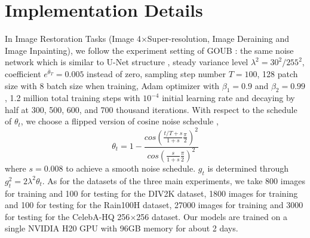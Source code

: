           
    






\section{Implementation Details}\label{appendix_experimental_details}
In Image Restoration Tasks (Image 4$\times$Super-resolution, Image Deraining and Image Inpainting), we follow the experiment setting of GOUB \cite{yue2024imagerestorationgeneralizedornsteinuhlenbeck}: the same noise network which is similar to U-Net structure \cite{chung2024diffusionposteriorsamplinggeneral}, steady variance level $\lambda^2 = 30^2 / 255^2$, coefficient $e^{\bar{\theta}_T} = 0.005$ instead of zero, sampling step number $T = 100$, 128 patch size with 8 batch size when training, Adam optimizer with $\beta_1 = 0.9$ and $\beta_2 = 0.99$ \cite{kingma2017adammethodstochasticoptimization}, 1.2 million total training steps with $10^{-4}$ initial learning rate and decaying by half at 300, 500, 600, and 700 thousand iterations. With respect to the schedule of $\theta_t$, we choose a flipped version of cosine noise schedule \cite{nichol2021improveddenoisingdiffusionprobabilistic, IRSDE}, 
\begin{equation}
    \theta_t = 1 - \frac{cos(\frac{t / T + s}{1 + s} \frac{\pi}{2})^2}{cos(\frac{s}{1 + s} \frac{\pi}{2})^2}
\end{equation}
where $s = 0.008$ to achieve a smooth noise schedule. $g_t$ is determined through $g_{t}^{2} = 2 \lambda^2 \theta_t$. As for the datasets of the three main experiments, we take 800 images for training and 100 for testing for the DIV2K dataset, 1800 images for training and 100 for testing for the Rain100H dataset, 27000 images for training and 3000 for testing for the CelebA-HQ 256$\times$256 dataset. Our models are trained on a single NVIDIA H20 GPU with 96GB memory for about 2 days.



